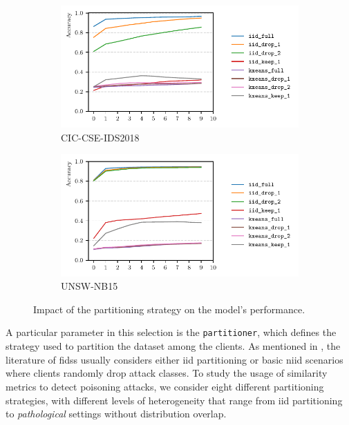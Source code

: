\begin{figure}
  \centering
  \begin{subfigure}{.49\linewidth}
    \centering
    \includegraphics[width=\linewidth]{figures/cicids/niid-perf.pdf}
    \caption{CIC-CSE-IDS2018\label{fig:assess.niid.cicids}}
  \end{subfigure}
  \hfill
  \begin{subfigure}{.49\linewidth}
    \centering
    \includegraphics[width=\linewidth]{figures/nb15/niid-perf.pdf}
    \caption{UNSW-NB15\label{fig:assess.niid.nb15}}
  \end{subfigure}
  \caption{
    Impact of the partitioning strategy on the model's performance.
    \label{fig:assess.niid}
  }
\end{figure}

A particular parameter in this selection is the \texttt{partitioner}, which defines the strategy used to partition the dataset among the clients.
As mentioned in , the literature of \glspl{fids} usually considers either \gls{iid} partitioning or basic \gls{niid} scenarios where clients randomly drop attack classes.
To study the usage of similarity metrics to detect poisoning attacks, we consider eight different partitioning strategies, with different levels of heterogeneity that range from \gls{iid} partitioning to \emph{pathological}\footnotemark{} settings without distribution overlap.

